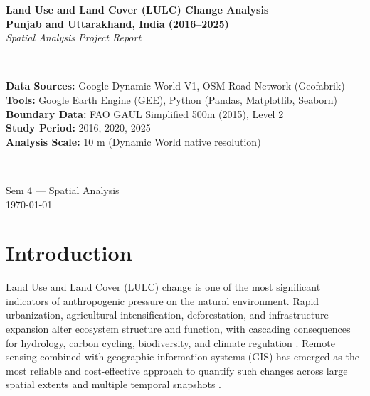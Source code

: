 \documentclass[12pt,a4paper]{article}
\begin{document}
\begin{titlepage}
\centering
\vspace*{2cm}
{\Huge\bfseries Land Use and Land Cover (LULC) Change Analysis\\[0.5em]
\large Punjab and Uttarakhand, India (2016--2025)}\\[2cm]
{\large\itshape Spatial Analysis Project Report}\\[1cm]
\rule{\linewidth}{0.5pt}\\[0.5cm]
{\normalsize
\textbf{Data Sources:} Google Dynamic World V1, OSM Road Network (Geofabrik)\\[0.3em]
\textbf{Tools:} Google Earth Engine (GEE), Python (Pandas, Matplotlib, Seaborn)\\[0.3em]
\textbf{Boundary Data:} FAO GAUL Simplified 500m (2015), Level 2\\[0.3em]
\textbf{Study Period:} 2016, 2020, 2025\\[0.3em]
\textbf{Analysis Scale:} 10 m (Dynamic World native resolution)
}\\[1cm]
\rule{\linewidth}{0.5pt}\\[2cm]
{\large Sem 4 --- Spatial Analysis}\\[0.5cm]
{\large\today}
\vfill
\end{titlepage}

\tableofcontents
\newpage
\listoffigures
\newpage

\section{Introduction}

Land Use and Land Cover (LULC) change is one of the most significant indicators of anthropogenic pressure on the natural environment. Rapid urbanization, agricultural intensification, deforestation, and infrastructure expansion alter ecosystem structure and function, with cascading consequences for hydrology, carbon cycling, biodiversity, and climate regulation \citep{foley2005global}. Remote sensing combined with geographic information systems (GIS) has emerged as the most reliable and cost-effective approach to quantify such changes across large spatial extents and multiple temporal snapshots \citep{wulder2022fifty}.
\end{document}
